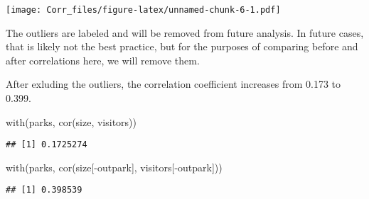 \documentclass[
]{article}
\newenvironment{Shaded}{\begin{snugshade}}{\end{snugshade}}
\newcommand{\FunctionTok}[1]{\textcolor[rgb]{0.00,0.00,0.00}{#1}}
\newcommand{\NormalTok}[1]{#1}
\newcommand{\SpecialCharTok}[1]{\textcolor[rgb]{0.00,0.00,0.00}{#1}}
\begin{document}
\texttt{[image: Corr\_files/figure-latex/unnamed-chunk-6-1.pdf]}

The outliers are labeled and will be removed from future analysis. In
future cases, that is likely not the best practice, but for the purposes
of comparing before and after correlations here, we will remove them.

After exluding the outliers, the correlation coefficient increases from
0.173 to 0.399.

\begin{Shaded}
\begin{Highlighting}[]
\FunctionTok{with}\NormalTok{(parks, }\FunctionTok{cor}\NormalTok{(size, visitors))}
\end{Highlighting}
\end{Shaded}

\begin{verbatim}
## [1] 0.1725274
\end{verbatim}

\begin{Shaded}
\begin{Highlighting}[]
\FunctionTok{with}\NormalTok{(parks, }\FunctionTok{cor}\NormalTok{(size[}\SpecialCharTok{{-}}\NormalTok{outpark], visitors[}\SpecialCharTok{{-}}\NormalTok{outpark]))}
\end{Highlighting}
\end{Shaded}

\begin{verbatim}
## [1] 0.398539
\end{verbatim}
\end{document}
